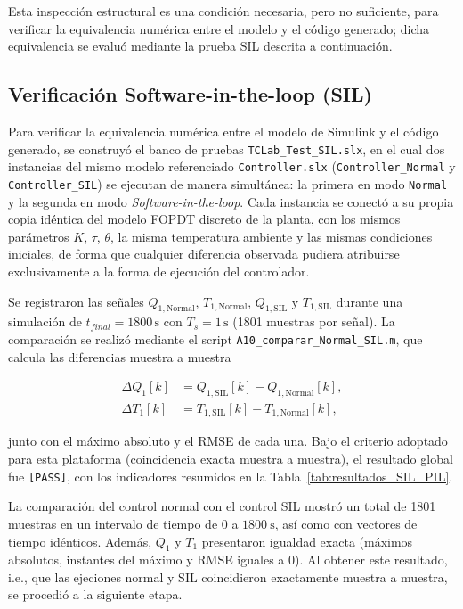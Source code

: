 \documentclass[journal]{IEEEtran}
\begin{document}
Esta inspección estructural es una condición necesaria, pero no suficiente, para
verificar la equivalencia numérica entre el modelo y el código generado; dicha
equivalencia se evaluó mediante la prueba SIL descrita a continuación.

\subsection{Verificación Software-in-the-loop (SIL)}
Para verificar la equivalencia numérica entre el modelo de Simulink y el código
generado, se construyó el banco de pruebas \texttt{TCLab\_Test\_SIL.slx}, en el
cual dos instancias del mismo modelo referenciado \texttt{Controller.slx}
(\texttt{Controller\_Normal} y \texttt{Controller\_SIL}) se ejecutan de manera
simultánea: la primera en modo \texttt{Normal} y la segunda en modo
\textit{Software-in-the-loop}. Cada instancia se conectó a su propia copia
idéntica del modelo FOPDT discreto de la planta, con los mismos parámetros
$K$, $\tau$, $\theta$, la misma temperatura ambiente y las mismas condiciones
iniciales, de forma que cualquier diferencia observada pudiera atribuirse
exclusivamente a la forma de ejecución del controlador.

Se registraron las señales $Q_{1,\text{Normal}}$, $T_{1,\text{Normal}}$,
$Q_{1,\text{SIL}}$ y $T_{1,\text{SIL}}$ durante una simulación de
$t_{final} = 1800\,\text{s}$ con $T_s = 1\,\text{s}$ (1801 muestras por señal).
La comparación se realizó mediante el script \texttt{A10\_comparar\_Normal\_SIL.m},
que calcula las diferencias muestra a muestra

\begin{equation}
\begin{aligned}
\Delta Q_1[k] &= Q_{1,\text{SIL}}[k] - Q_{1,\text{Normal}}[k], \\
\Delta T_1[k] &= T_{1,\text{SIL}}[k] - T_{1,\text{Normal}}[k],
\end{aligned}
\label{eq:diferencias_SIL}
\end{equation}

junto con el máximo absoluto y el RMSE de cada una. Bajo el criterio adoptado
para esta plataforma (coincidencia exacta muestra a muestra), el resultado
global fue \texttt{[PASS]}, con los indicadores resumidos en la
Tabla~\ref{tab:resultados_SIL_PIL}.

La comparación del control normal con el control SIL mostró un total de 1801 muestras en un intervalo de tiempo de 0 a $1800~\text{s}$, así como con vectores de tiempo idénticos. Además, $Q_1$ y $T_1$ presentaron igualdad exacta (máximos absolutos, instantes del máximo y RMSE iguales a 0). Al obtener este resultado, i.e., que las ejeciones normal y SIL coincidieron exactamente muestra a muestra, se procedió a la siguiente etapa.
\end{document}
